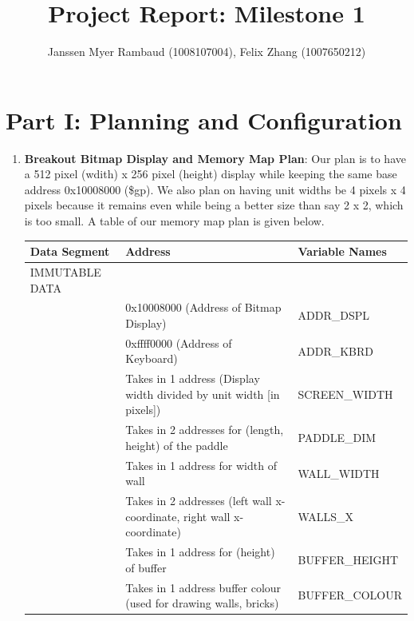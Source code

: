\documentclass{article}
\title{Project Report: Milestone 1}
\author{Janssen Myer Rambaud (1008107004), Felix Zhang (1007650212)}
\begin{document}
\maketitle

\section{Part I: Planning and Configuration}

\begin{enumerate}
\item \textbf{Breakout Bitmap Display and Memory Map Plan}: 
Our plan is to have a 512 pixel (wdith) x 256 pixel (height) display while keeping the same base address 0x10008000 (\$gp). 
We also plan on having unit widths be 4 pixels x 4 pixels because it remains even while being a better size than say 2 x 2, which is too small.
A table of our memory map plan is given below.
\begin{table}[ht!]
\begin{tabular}{|l|l|l|}
\hline
Data Segment     & Address                                                           & Variable Names           \\ \hline
IMMUTABLE DATA   &                                                                   &                \\ \hline
                 & 0x10008000 (Address of Bitmap Display)                            & ADDR\_DSPL    \\ \hline
                 & 0xffff0000 (Address of Keyboard)                                  & ADDR\_KBRD     \\ \hline
                 & Takes in 1 address (Display width divided by unit width [in pixels])           & SCREEN\_WIDTH  \\ \hline
                 & Takes in 2 addresses for (length, height) of the paddle                                           & PADDLE\_DIM    \\ \hline
                 & Takes in 1 address for width of wall                                           & WALL\_WIDTH    \\ \hline
                 & Takes in 2 addresses (left wall x-coordinate, right wall x-coordinate)                                 & WALLS\_X     \\ \hline
                                  & Takes in 1 address for (height) of buffer                                                           & BUFFER\_HEIGHT \\ \hline
                 & Takes in 1 address buffer colour (used for drawing walls, bricks)              & BUFFER\_COLOUR \\ \hline

\end{tabular}
\end{table}
\end{enumerate}
\end{document}
